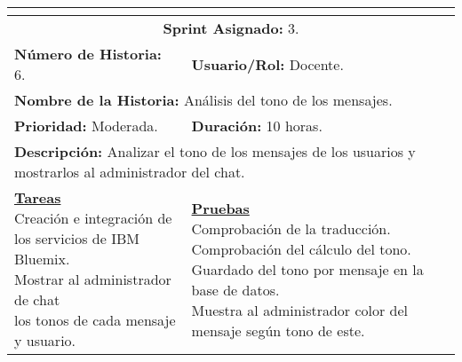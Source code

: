 \resizebox{15cm}{!} {
	\begin{tabular}{|l|l|}
		\hline
		\multicolumn{2}{|c|}{\cellcolor[HTML]{343434}{\color[HTML]{FFFFFF} \textbf{Historia de Usuario}}} \\
		\hline
		\multicolumn{2}{|c|}{\textbf{Sprint Asignado:} 3.} \\
		\hline
		\textbf{Número de Historia:} 6. & \textbf{Usuario/Rol:} Docente.\\
		\hline
		\multicolumn{2}{|l|}{\textbf{Nombre de la Historia:} Análisis del tono de los mensajes.} \\
		\hline
		\textbf{Prioridad:} Moderada. & \textbf{Duración:} 10 horas.\\
		\hline
		\multicolumn{2}{|l|}{\textbf{Descripción:} Analizar el tono de los mensajes de los usuarios y mostrarlos al administrador del chat.} \\
		\hline
		\specialcell{\underline{\textbf{Tareas}} \\ Creación e integración de \\ los servicios de IBM Bluemix. \\ Mostrar al administrador de chat \\ los tonos de cada mensaje y usuario.} & \specialcell{\underline{\textbf{Pruebas}} \\ Comprobación de la traducción. \\ Comprobación del cálculo del tono. \\ Guardado del tono por mensaje en la base de datos. \\ Muestra al administrador color del mensaje según tono de este.} \\
		\hline
	\end{tabular}
}
